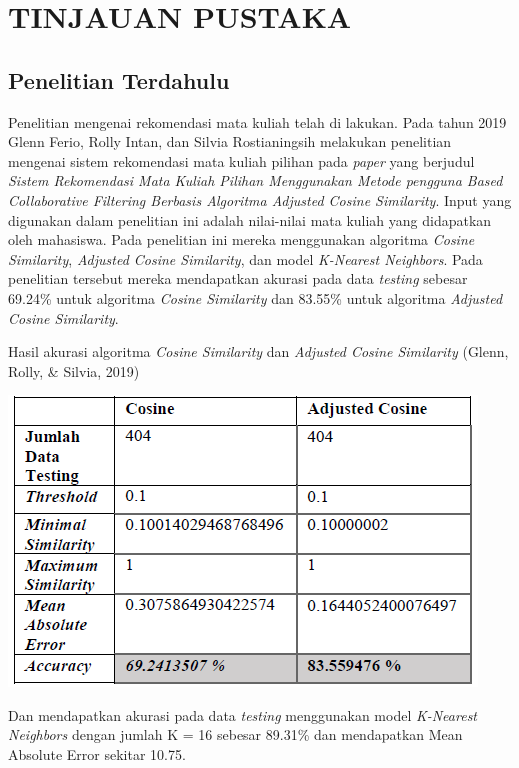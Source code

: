 \section{TINJAUAN PUSTAKA}

\subsection{Penelitian Terdahulu}
Penelitian mengenai rekomendasi mata kuliah telah di lakukan. Pada tahun 2019 Glenn Ferio, Rolly Intan, dan Silvia Rostianingsih melakukan
penelitian mengenai sistem rekomendasi mata kuliah pilihan pada \emph{paper} yang berjudul
\emph{Sistem Rekomendasi Mata Kuliah Pilihan Menggunakan Metode pengguna Based Collaborative Filtering Berbasis Algoritma Adjusted Cosine Similarity}.
Input yang digunakan dalam penelitian ini adalah nilai-nilai mata kuliah yang didapatkan oleh mahasiswa. Pada penelitian ini mereka menggunakan algoritma
\emph{Cosine Similarity}, \emph{Adjusted Cosine Similarity}, dan model \emph{K-Nearest Neighbors}. Pada penelitian tersebut mereka mendapatkan akurasi
pada data \emph{testing} sebesar 69.24\% untuk algoritma \emph{Cosine Similarity} dan 83.55\% untuk algoritma \emph{Adjusted Cosine Similarity}.

\begin{table} [ht] \centering
  \caption{Hasil akurasi algoritma \emph{Cosine Similarity} dan \emph{Adjusted Cosine Similarity} {(Glenn, Rolly, \& Silvia, 2019)}}
  \vspace*{3mm}
  \includegraphics{gambar/akurasi-algoritma-cosine-similarity.png}
\end{table}

Dan mendapatkan akurasi pada data \emph{testing} menggunakan model \emph{K-Nearest Neighbors} dengan jumlah K = 16 sebesar 89.31\%
dan mendapatkan Mean Absolute Error sekitar 10.75.

